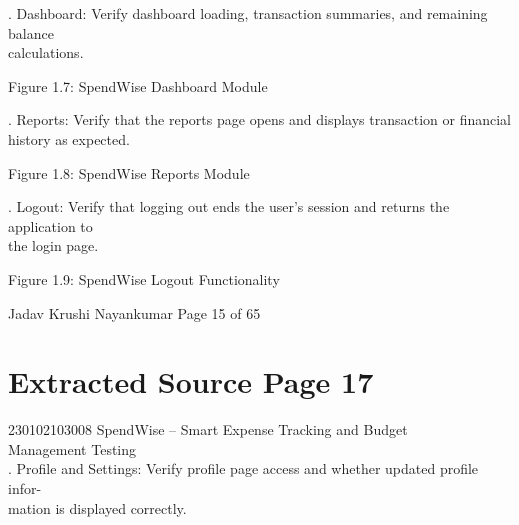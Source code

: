 \documentclass[12pt,a4paper]{report}
\begin{document}
. Dashboard: Verify dashboard loading, transaction summaries, and remaining balance\\ 
calculations.\\ 

\smallskip

\smallskip

\smallskip

\smallskip
Figure 1.7: SpendWise Dashboard Module\\ 

\smallskip

. Reports: Verify that the reports page opens and displays transaction or financial\\ 
history as expected.\\ 

\smallskip

\smallskip

\smallskip

\smallskip
Figure 1.8: SpendWise Reports Module\\ 

\smallskip

. Logout: Verify that logging out ends the user’s session and returns the application to\\ 
the login page.\\ 

\smallskip

\smallskip

\smallskip

\smallskip
Figure 1.9: SpendWise Logout Functionality\\ 

\smallskip

\smallskip
Jadav Krushi Nayankumar                                                    Page 15 of 65\\ 

\clearpage
\section*{Extracted Source Page 17}
230102103008                       SpendWise – Smart Expense Tracking and Budget\\ 
Management Testing\\ 

. Profile and Settings: Verify profile page access and whether updated profile infor-\\ 
mation is displayed correctly.\\ 
\end{document}
